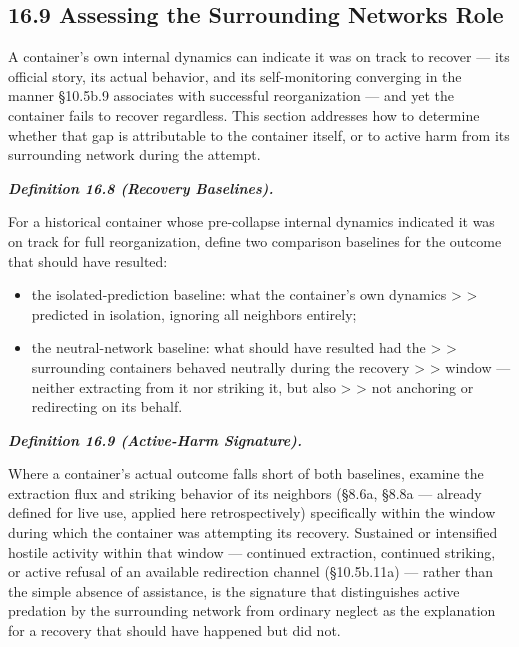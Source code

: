 \documentclass[
]{article}
\begin{document}
\hypertarget{assessing-the-surrounding-networks-role}{%
\subsection{16.9 Assessing the Surrounding Network\textquotesingle s
Role}\label{assessing-the-surrounding-networks-role}}

A container's own internal dynamics can indicate it was on track to
recover --- its official story, its actual behavior, and its
self-monitoring converging in the manner §10.5b.9 associates with
successful reorganization --- and yet the container fails to recover
regardless. This section addresses how to determine whether that gap is
attributable to the container itself, or to active harm from its
surrounding network during the attempt.

\emph{\textbf{Definition 16.8 (Recovery Baselines).}}

For a historical container whose pre-collapse internal dynamics
indicated it was on track for full reorganization, define two comparison
baselines for the outcome that should have resulted:

\begin{itemize}
\item
  the isolated-prediction baseline: what the container's own dynamics
  \textgreater{} \textgreater{} predicted in isolation, ignoring all
  neighbors entirely;
\item
  the neutral-network baseline: what should have resulted had the
  \textgreater{} \textgreater{} surrounding containers behaved neutrally
  during the recovery \textgreater{} \textgreater{} window --- neither
  extracting from it nor striking it, but also \textgreater{}
  \textgreater{} not anchoring or redirecting on its behalf.
\end{itemize}

\emph{\textbf{Definition 16.9 (Active-Harm Signature).}}

Where a container's actual outcome falls short of both baselines,
examine the extraction flux and striking behavior of its neighbors
(§8.6a, §8.8a --- already defined for live use, applied here
retrospectively) specifically within the window during which the
container was attempting its recovery. Sustained or intensified hostile
activity within that window --- continued extraction, continued
striking, or active refusal of an available redirection channel
(§10.5b.11a) --- rather than the simple absence of assistance, is the
signature that distinguishes active predation by the surrounding network
from ordinary neglect as the explanation for a recovery that should have
happened but did not.
\end{document}
